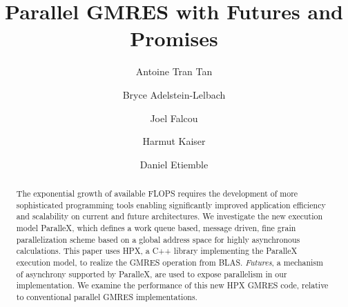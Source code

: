 \documentclass{llncs}
\begin{document}
\title{Parallel GMRES with Futures and Promises}

\author{Antoine Tran Tan \and Bryce Adelstein-Lelbach \and Joel Falcou \and Harmut Kaiser \and
Daniel Etiemble }

\maketitle

\begin{abstract}
The exponential growth of available FLOPS requires the development of 
more sophisticated programming tools enabling significantly improved 
application efficiency and scalability on current and future architectures. 
We investigate the new execution model ParalleX, 
which defines a work queue based, message driven, fine grain parallelization 
scheme based on a global address space for highly asynchronous calculations. 
This paper uses HPX, a C++ library implementing the 
ParalleX execution model, to realize the GMRES operation from
BLAS. \emph{Futures}, a mechanism of asynchrony supported by
ParalleX, are used to expose parallelism in our implementation. We examine
the performance of this new HPX GMRES code, relative to conventional parallel
GMRES implementations. 

\end{abstract}
\end{document}
